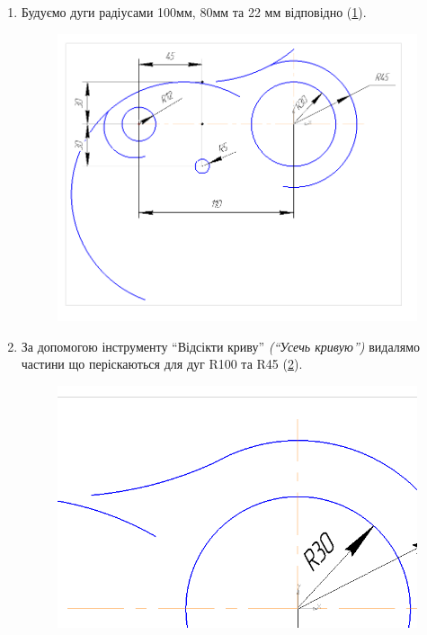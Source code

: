 \begin{enumerate}[leftmargin=*]
\item Будуємо дуги радіусами 100мм, 80мм та 22 мм відповідно (\ref{fig:lab4:step6}).
  \begin{figure}[!ht]
    \centering \includegraphics[width=0.7\linewidth]{./images/lab4/step6.png}
    \caption{\label{fig:lab4:step6}}
  \end{figure}
  \FloatBarrier

\item \label{item:cut_curve}За допомогою інструменту ``Відсікти криву'' \textit{(``Усечь кривую'')}
  видалямо частини що періскаються для дуг R100 та R45 (\ref{fig:lab4:step7}).
  \begin{figure}[!ht]
    \centering \includegraphics[width=0.9\linewidth]{./images/lab4/step7.png}
    \caption{\label{fig:lab4:step7}}
  \end{figure}
  \FloatBarrier


\end{enumerate}
